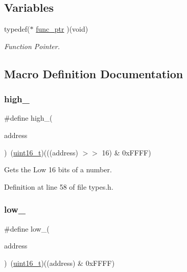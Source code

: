 \subsection*{Variables}
\begin{DoxyCompactItemize}
\item 
typedef($\ast$ \hyperlink{a00104_a5e730b1100d491afc6fa17d12fcd15a8_a5e730b1100d491afc6fa17d12fcd15a8}{func\+\_\+ptr} )(void)
\begin{DoxyCompactList}\small\item\em Function Pointer. \end{DoxyCompactList}\end{DoxyCompactItemize}


\subsection{Macro Definition Documentation}
\mbox{\label{a00104_a0a63db19c3e2153ed419aeccf4e33c92_a0a63db19c3e2153ed419aeccf4e33c92}} 
\subsubsection{\texorpdfstring{high\+\_}{high\_16}}
{\footnotesize\ttfamily \#define high\+\_(\begin{DoxyParamCaption}\item[{}]{address }\end{DoxyParamCaption})~(\hyperlink{a00104_a273cf69d639a59973b6019625df33e30_a273cf69d639a59973b6019625df33e30}{uint16\+\_\+t})(((address) $>$$>$ 16) \& 0x\+F\+F\+F\+F)}



Gets the Low 16 bits of a number. 



Definition at line 58 of file types.\+h.

\mbox{\label{a00104_aded7ad58a4bedfffea10d5ae9c0c817e_aded7ad58a4bedfffea10d5ae9c0c817e}} 
\subsubsection{\texorpdfstring{low\+\_}{low\_16}}
{\footnotesize\ttfamily \#define low\+\_(\begin{DoxyParamCaption}\item[{}]{address }\end{DoxyParamCaption})~(\hyperlink{a00104_a273cf69d639a59973b6019625df33e30_a273cf69d639a59973b6019625df33e30}{uint16\+\_\+t})((address) \& 0x\+F\+F\+F\+F)}



